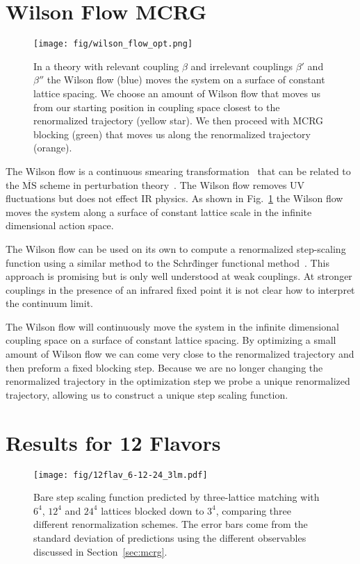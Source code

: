 \documentclass{PoS}
\newcommand{\be}{\ensuremath{\beta} }
\newcommand{\MSbar}{\ensuremath{\overline{\textrm{MS}} } }
\newcommand{\fig}[1]{Fig.~\ref{#1}}
\newcommand{\secref}[1]{Section~\ref{#1}}
\begin{document}
\section{\label{sec:wmcrg}Wilson Flow MCRG} %
\begin{figure}[th]
  \centering
  \texttt{[image: fig/wilson\_flow\_opt.png]}
  \caption{In a theory with relevant coupling \be and irrelevant couplings $\be'$ and $\be''$ the Wilson flow (blue) moves the system on a surface of constant lattice spacing.  We choose an amount of Wilson flow that moves us from our starting position in coupling space closest to the renormalized trajectory (yellow star).  We then proceed with MCRG blocking (green) that moves us along the renormalized trajectory (orange).}
  \label{fig:wflow_opt}
\end{figure}

The Wilson flow is a continuous smearing transformation~\cite{Narayanan:2006rf} that can be related to the \MSbar scheme in perturbation theory~\cite{Luscher:2010iy}.
The Wilson flow removes UV fluctuations but does not effect IR physics.
As shown in \fig{fig:wflow_opt} the Wilson flow moves the system along a surface of constant lattice scale in the infinite dimensional action space.

The Wilson flow can be used on its own to compute a renormalized step-scaling function using a similar method to the Schr\"dinger functional method~\cite{Fodor:2012td, Fodor:2012qh}.
This approach is promising but is only well understood at weak couplings.
At stronger couplings in the presence of an infrared fixed point it is not clear how to interpret the continuum limit.

The Wilson flow will continuously move the system in the infinite dimensional coupling space on a surface of constant lattice spacing.
By optimizing a small amount of Wilson flow we can come very close to the renormalized trajectory and then preform a fixed blocking step.
Because we are no longer changing the renormalized trajectory in the optimization step we probe a unique renormalized trajectory, allowing us to construct a unique step scaling function.



\section{\label{sec:results}Results for 12 Flavors} %
\begin{figure}[ht]
  \centering
  \texttt{[image: fig/12flav\_6-12-24\_3lm.pdf]}
  \caption{Bare step scaling function predicted by three-lattice matching with $6^4$, $12^4$ and $24^4$ lattices blocked down to $3^4$, comparing three different renormalization schemes.  The error bars come from the standard deviation of predictions using the different observables discussed in \protect\secref{sec:mcrg}.}
\label{fig:24to3}
\end{figure}
\end{document}
